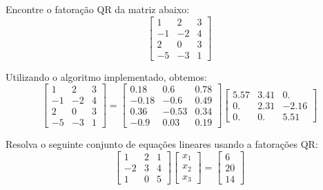 \begin{question}
  Encontre o fatoração QR da matriz abaixo:
  $$\begin{bmatrix}
      1  & 2  & 3 \\
      -1 & -2 & 4 \\
      2  & 0  & 3 \\
      -5 & -3 & 1
    \end{bmatrix}$$
\end{question}

\begin{resolution}
  Utilizando o algoritmo implementado, obtemos:
  \begin{equation}
    \begin{bmatrix}
      1  & 2  & 3 \\
      -1 & -2 & 4 \\
      2  & 0  & 3 \\
      -5 & -3 & 1
    \end{bmatrix} =
    \begin{bmatrix}
      0.18  & 0.6   & 0.78 \\
      -0.18 & -0.6  & 0.49 \\
      0.36  & -0.53 & 0.34 \\
      -0.9  & 0.03  & 0.19
    \end{bmatrix}
    \begin{bmatrix}
      5.57 & 3.41 & 0.    \\
      0.   & 2.31 & -2.16 \\
      0.   & 0.   & 5.51
    \end{bmatrix}
  \end{equation}
\end{resolution}

\begin{question}
  Resolva o seguinte conjunto de equações lineares usando a fatorações QR:
  \begin{equation*}
    \begin{bmatrix}
      1 & 2 & 1 \\ -2 & 3 & 4 \\ 1 & 0 & 5
    \end{bmatrix} \begin{bmatrix}
      x_1 \\ x_2 \\ x_3
    \end{bmatrix} =
    \begin{bmatrix}
      6 \\ 20 \\ 14
    \end{bmatrix}
  \end{equation*}
\end{question}


